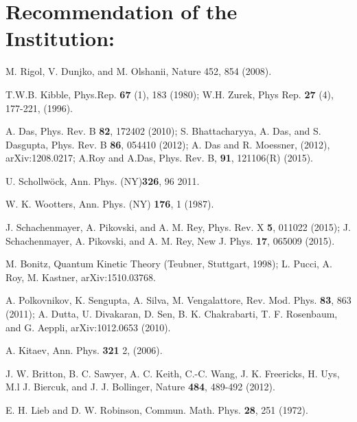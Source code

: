 \documentclass[a4paper,11pt,color]{article}
\renewenvironment{thebibliography}[1]{%
    \begin{oldthebibliography}{#1}%
      \setlength{\parskip}{0ex}%
      \setlength{\itemsep}{0ex}%
  }%
  {%
    \end{oldthebibliography}%
  }
\begin{document}
\section{\sc  Recommendation of the Institution:}
\vspace{2in}
\pagebreak
\begin{thebibliography}{}
  
M. Rigol, V. Dunjko, and M. Olshanii, Nature 452, 854 (2008).

T.W.B. Kibble, Phys.Rep. {\bf 67} (1), 183 (1980); W.H. Zurek, Phys Rep. {\bf 27} (4), 177-221, (1996).

A. Das, Phys. Rev. B {\bf 82}, 172402 (2010); S. Bhattacharyya, A. Das, and S. Dasgupta, Phys. Rev.
B {\bf 86}, 054410 (2012); A. Das and R. Moessner, (2012), arXiv:1208.0217; A.Roy and A.Das, Phys. Rev. B, {\bf 91}, 121106(R) (2015).

%
 {U.} {Schollw{\"o}ck},  {Ann. Phys. (NY)}\textbf {{326}}, {96}  {2011}.
 
W. K. Wootters, Ann. Phys. (NY) {\bf 176}, 1 (1987).

J. Schachenmayer, A. Pikovski, and A. M. Rey, Phys. Rev. X {\bf 5}, 011022 (2015); J. Schachenmayer, A. Pikovski, and A. M. Rey, New J. Phys.
{\bf 17}, 065009 (2015).

M. Bonitz, Quantum Kinetic Theory (Teubner, Stuttgart, 1998); L. Pucci, A. Roy, M. Kastner, arXiv:1510.03768.


A. Polkovnikov, K. Sengupta, A. Silva, M. Vengalattore, Rev. Mod. Phys. \textbf{83}, 863 (2011); A. Dutta, U. Divakaran, D. Sen, B. K. Chakrabarti, T. F. Rosenbaum, and G. Aeppli, arXiv:1012.0653 (2010).


A. Kitaev, Ann. Phys. {\bf 321} 2, (2006).


J. W. Britton,	B. C. Sawyer,	A. C. Keith,	C.-C. Wang,	J. K. Freericks, H. Uys,	M.l J. Biercuk, and J. J. Bollinger, Nature {\bf 484}, 489-492 (2012).



E. H. Lieb and D. W. Robinson, Commun. Math. Phys. {\bf 28}, 251 (1972).


\end{thebibliography}
\end{document}
